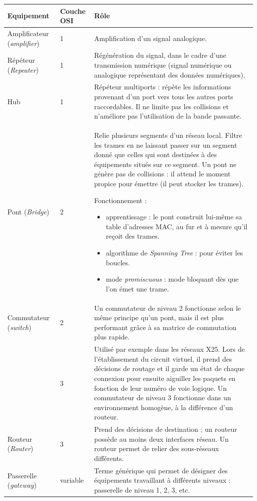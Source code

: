 \documentclass[11pt,english,french]{scrreprt}
\theoremstyle{remark}
\theoremstyle{definition}
\begin{document}
	\begin{tabularx}{\linewidth}{>{\setlength\hsize{0.4\hsize}}X>{\setlength\hsize{0.3\hsize}}X>{\setlength\hsize{2.3\hsize}}X}
\hline 
Equipement & Couche OSI & Rôle\tabularnewline
\hline
\hline 
Amplificateur (\emph{amplifier}) & 1 & Amplification d'un signal analogique.\tabularnewline
\hline 
Répéteur (\emph{Repeater}) & 1 & Régénération du signal, dans le cadre d'une transmission numérique
(signal numérique ou analogique représentant des données numériques).\tabularnewline
\hline 
Hub & 1 & Répéteur multiports : répète les informations provenant d'un port
vers tous les autres ports raccordables. Il ne limite pas les collisions
et n'améliore pas l'utilisation de la bande passante.\tabularnewline
\hline 
Pont (\emph{Bridge}) & 2 & Relie plusieurs segments d'un réseau local. Filtre les trames en ne
laissant passer sur un segment donné que celles qui sont destinées
à des équipements situés sur ce segment. Un pont ne génère pas de
collisions : il attend le moment propice pour émettre (il peut stocker
les trames). 

\begin{minipage}{0.7\textwidth}
\medskip Fonctionnement :\par
\begin{itemize}
\item apprentissage : le pont construit lui-même sa table d'adresses MAC, au fur et à mesure qu'il reçoit des trames.
\item algorithme de \emph{Spanning Tree} : pour éviter les boucles.
\item mode \emph{promiscuous} : mode bloquant dès que l'on émet une trame.
\end{itemize}
\medskip
\end{minipage}
\tabularnewline
\hline 
Commutateur (\emph{switch}) & 2 & Un commutateur de niveau 2 fonctionne selon le même principe qu'un pont, mais il est plus performant grâce à sa matrice de commutation plus rapide.\tabularnewline
\cline{2-3} 
 & 3 & Utilisé par exemple dans les réseaux X25. Lors de l'établissement du circuit virtuel, il prend des décisions de routage et il garde un état de chaque connexion pour ensuite aiguiller les paquets en fonction de leur numéro de voie logique. Un commutateur de niveau 3 fonctionne dans un environnement homogène, à la différence d'un routeur.\tabularnewline
\hline 
Routeur (\emph{Router}) & 3 & Prend des décisions de destination ; un routeur possède au moins deux interfaces réseau. Un routeur permet de relier des sous-réseaux différents.\tabularnewline
\hline 
Passerelle (\emph{gateway}) & variable & Terme générique qui permet de désigner des équipements travaillant à différents niveaux : passerelle de niveau 1, 2, 3, etc.\tabularnewline
\hline
\end{tabularx}
\end{document}
